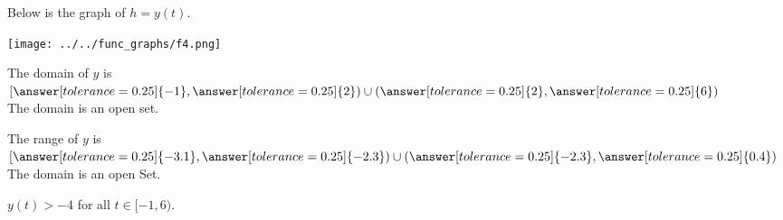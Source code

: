 \documentclass{ximera}
\author{Lee Wayand}
\begin{document}
\begin{exercise}  





Below is the graph of $h=y(t)$.  

\begin{image}
\texttt{[image: ../../func\_graphs/f4.png]}
\end{image}









\begin{question} 


The domain of $y$ is  $\left[ \answer[tolerance=0.25]{-1}, \answer[tolerance=0.25]{2} \right) \cup  \left( \answer[tolerance=0.25]{2}, \answer[tolerance=0.25]{6} \right) $   \\


The domain is an open set.
\begin{multipleChoice}
\end{multipleChoice}

\end{question}






\begin{question} 


The range of $y$ is  $\left[ \answer[tolerance=0.25]{-3.1}, \answer[tolerance=0.25]{-2.3} \right) \cup  \left( \answer[tolerance=0.25]{-2.3}, \answer[tolerance=0.25]{0.4} \right) $   \\


The domain is an open Set.
\begin{multipleChoice}
\end{multipleChoice}


\end{question}









\begin{question} 



$y(t) > -4$ for all $t \in [-1, 6)$.
\begin{multipleChoice}
\end{multipleChoice}


\end{question}
\end{exercise}
\end{document}
